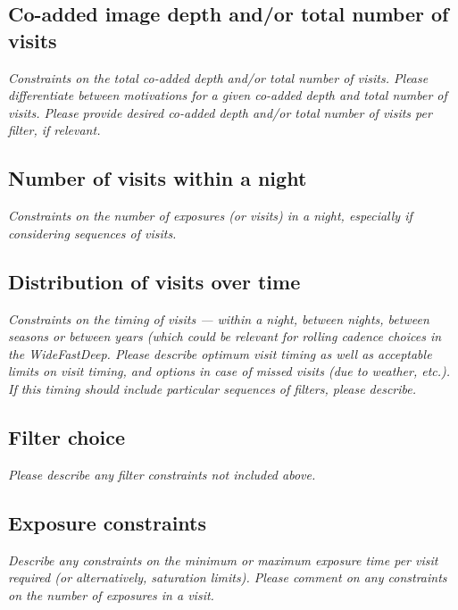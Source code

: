\documentclass[11pt]{article}
\begin{document}
\subsection{Co-added image depth and/or total number of visits}
\begin{footnotesize}{\it  Constraints on the total co-added depth and/or total number of visits.
Please differentiate between motivations for a given co-added depth and total number of visits. 
Please provide desired co-added depth and/or total number of visits per filter, if relevant.}
\end{footnotesize}

\subsection{Number of visits within a night}
\begin{footnotesize}{\it Constraints on the number of exposures (or visits) in a night, especially if considering sequences of visits.  }
\end{footnotesize}

\subsection{Distribution of visits over time}
\begin{footnotesize}{\it Constraints on the timing of visits --- within a night, between nights, between seasons or
between years (which could be relevant for rolling cadence choices in the WideFastDeep. 
Please describe optimum visit timing as well as acceptable limits on visit timing, and options in
case of missed visits (due to weather, etc.). If this timing should include particular sequences
of filters, please describe.}
\end{footnotesize}

\subsection{Filter choice}
\begin{footnotesize}
{\it Please describe any filter constraints not included above.}
\end{footnotesize}

\subsection{Exposure constraints}
\begin{footnotesize}
{\it Describe any constraints on the minimum or maximum exposure time per visit required (or alternatively, saturation limits).
Please comment on any constraints on the number of exposures in a visit.}
\end{footnotesize}
\end{document}
